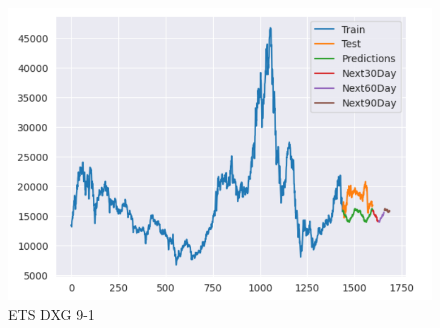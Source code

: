 \documentclass[conference]{IEEEtran}
\begin{document}
\begin{enumerate}
\begin{figure}[htbp]
\begin{minipage}{0.23\textwidth}
    \includegraphics[width=1\textwidth]{experiment/ets/TEAM4_ETS_DXG_9_1.png}
    \caption{ETS DXG 9-1}
    \label{fig:nvl_histogram}
    \end{minipage}


\end{figure}
\end{enumerate}
\end{document}
